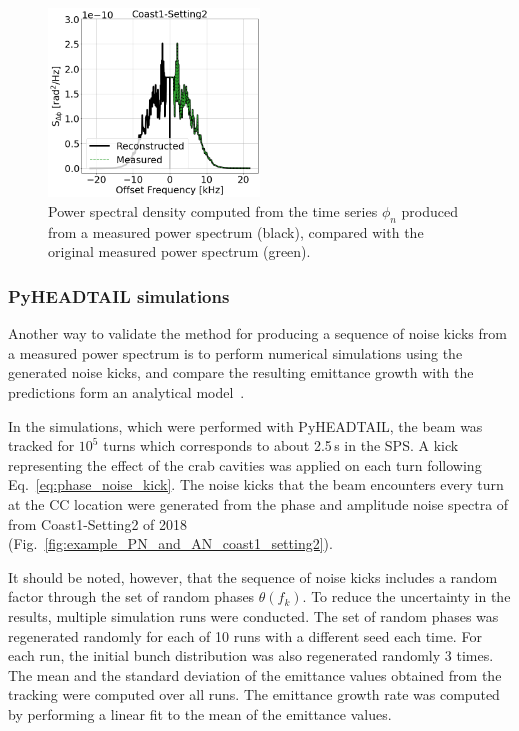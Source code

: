 \begin{figure}[!ht]
     \centering         
     \includegraphics[width=0.5\textwidth]{./images/app_B/coast1_setting2_v5.png}
         \caption{Power spectral density computed from the time series $\phi_n$ produced from a measured power spectrum (black), compared with the original measured power spectrum (green).}
         \label{fig:generate_noise_kicks_sanity_check_1}
\end{figure} 

\subsubsection*{PyHEADTAIL simulations} %
Another way to validate the method for producing a sequence of noise kicks from a measured power spectrum is to perform numerical simulations using the generated noise kicks, and compare the resulting emittance growth with the predictions form an analytical model~\cite{PhysRevSTAB.18.101001}.

In the simulations, which were performed with PyHEADTAIL, the beam was tracked for $10^5$ turns which corresponds to about 2.5\,s in the SPS. A kick representing the effect of the crab cavities was applied on each turn following Eq.~\eqref{eq:phase_noise_kick}. The noise kicks that the beam encounters every turn at the CC location were generated from the phase and amplitude noise spectra of from Coast1-Setting2 of 2018 (Fig.~\ref{fig:example_PN_and_AN_coast1_setting2}). 

It should be noted, however, that the sequence of noise kicks includes a random factor through the set of random phases $\theta(f_k)$. To reduce the uncertainty in the results, multiple simulation runs were conducted. The set of random phases was regenerated randomly for each of 10 runs with a different seed each time. For each run, the initial bunch distribution was also regenerated randomly 3 times. The mean and the standard deviation of the emittance values obtained from the tracking were computed over all runs. The emittance growth rate was computed by performing a linear fit to the mean of the emittance values.

